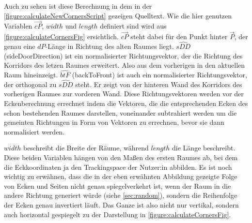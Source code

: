 Auch zu sehen ist diese Berechnung in dem in der \autoref{figure:calculateNewCornersScript} gezeigen Quelltext.
Wie die hier genutzen Variablen
$\vec{cP}$,
$width$ und $length$ definiert sind wird aus \autoref{figure:calculateCornersFig} ersichtlich. %
$\vec{cP}$ steht dabei für den Punkt hinter $\vec{P}$, der genau eine $dP$-Länge in Richtung des alten Raumes liegt. $\hat{sDD}$ (sideDoorDirection) ist ein normalisierter Richtungsvektor,
der die Richtung des Korridors des letzen Raumes erweitert. %
Also aus dem vorherigen in den aktuellen Raum hineinzeigt.
$\hat{btF}$ (backToFront) ist auch ein normalisierter Richtungsvektor, der orthogonal zu $\hat{sDD}$ steht.
Er zeigt von der hinteren Wand des Korridors des vorherigen Raumes zur vorderen Wand.
Diese Richtungsvektoren werden vor der Eckenberechnung errechnet indem die Vektoren, die die entsprechenden Ecken des schon bestehenden Raumes darstellen, voneinander subtrahiert werden um die gemeinten Richtungen in Form von Vektoren zu errechnen, bevor sie dann normalisiert werden.

$width$ beschreibt die Breite der Räume, während $length$ die Länge beschreibt. Diese beiden Variablen hängen von den Maßen des ersten Raumes ab, bei dem die Eckkoordinaten ja den Trackingspace der Nutzer:in abbilden. Es ist noch wichtig zu erwähnen, dass die in der eben erwähnten Abbildung gezeigte Folge von Ecken und Seiten nicht genau spiegelverkehrt ist, wenn der Raum in die andere Richtung generiert würde (siehe \autoref{sec:random}), sondern die Reihenfolge der Ecken genau invertiert läuft. Das Ganze ist also nicht nur vertikal, sondern auch horizontal gespiegelt zu der Darstellung in \autoref{figure:calculateCornersFig}.

